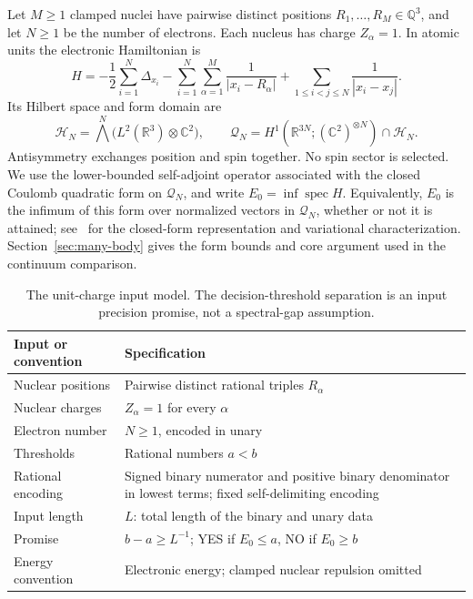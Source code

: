 Let $M\ge1$ clamped nuclei have pairwise distinct positions
$R_1,\ldots,R_M\in\mathbb Q^3$, and let $N\ge1$ be the number of
electrons. Each nucleus has charge $Z_\alpha=1$. In atomic units the
electronic Hamiltonian is
\begin{equation}\tag{H}\label{eq:electronic-H}
 H=-\frac12\sum_{i=1}^N\Delta_{x_i}
   -\sum_{i=1}^N\sum_{\alpha=1}^M\frac1{|x_i-R_\alpha|}
   +\sum_{1\leq i<j\leq N}\frac1{|x_i-x_j|}.
\end{equation}
Its Hilbert space and form domain are
\[
 \mathcal H_N=\bigwedge^N\bigl(L^2(\mathbb R^3)\otimes\mathbb C^2\bigr),
 \qquad
 \mathcal Q_N=H^1(\mathbb R^{3N};(\mathbb C^2)^{\otimes N})
                  \cap\mathcal H_N.
\]
Antisymmetry exchanges position and spin together. No spin sector is
selected. We use the lower-bounded self-adjoint operator associated with
the closed Coulomb quadratic form on $\mathcal Q_N$, and write
$E_0=\inf\operatorname{spec}H$. Equivalently, $E_0$ is the infimum of
this form over normalized vectors in $\mathcal Q_N$, whether or not it
is attained; see~\cite[Theorems 2.13 and 2.19]{Teschl2009} for the
closed-form representation and variational characterization.
Section~\ref{sec:many-body} gives the form bounds and core argument
used in the continuum comparison.

\begin{table}[htbp]
\centering
\small
\begin{tabular}{@{}p{.23\linewidth}p{.70\linewidth}@{}}
\toprule
Input or convention & Specification \\
\midrule
Nuclear positions & Pairwise distinct rational triples $R_\alpha$ \\
Nuclear charges & $Z_\alpha=1$ for every $\alpha$ \\
Electron number & $N\ge1$, encoded in unary \\
Thresholds & Rational numbers $a<b$ \\
Rational encoding & Signed binary numerator and positive binary denominator
in lowest terms; fixed self-delimiting encoding \\
Input length & $L$: total length of the binary and unary data \\
Promise & $b-a\ge L^{-1}$; YES if $E_0\le a$, NO if $E_0\ge b$ \\
Energy convention & Electronic energy; clamped nuclear repulsion omitted \\
\bottomrule
\end{tabular}
\caption{The unit-charge input model. The decision-threshold separation is
an input precision promise, not a spectral-gap assumption.}
\label{tab:input-model}
\end{table}

